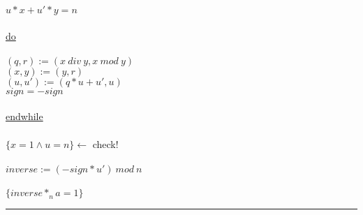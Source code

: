 \documentclass[18pt,a4paper]{article}
\newcommand{\tab}{\hspace*{2em}}
\begin{document}
\tab \tab $u*x + u' * y =n$\\
\\
\uline{do}\\
\\
\tab $(q,r) := (x \: div\: y, x\: mod\: y)$\\
\tab $(x,y) := (y,r)$\\
\tab $(u,u') := (q*u + u', u)$\\
\tab $sign = -sign$\\
\\
\uline{endwhile}\\
\\
$\{ x =1 \wedge u = n\} \leftarrow$ check!\\
\\
$inverse := (-sign * u')\: mod\: n$\\
\\
$\{inverse *_n a =1\}$\\
\rule{\textwidth}{0.4mm}\\




%
%
\end{document}
